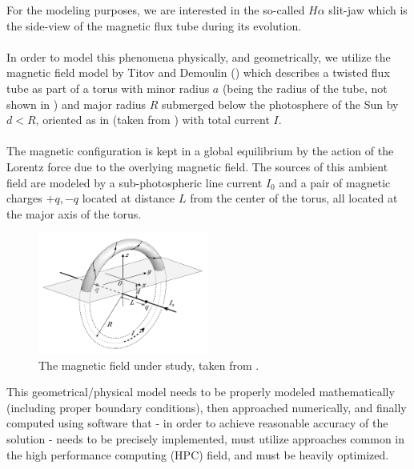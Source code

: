 For the modeling purposes, we are interested in the so-called $H\alpha$ slit-jaw which is the side-view of the magnetic flux tube during its evolution.
\paragraph{}
In order to model this phenomena physically, and geometrically, we utilize the magnetic field model by Titov and Demoulin (\cite{td}) which describes a twisted flux tube as part of a torus with minor radius $a$ (being the radius of the tube, not shown in ) and major radius $R$ submerged below the photosphere of the Sun by $d < R$, oriented as in  (taken from \cite{td}) with total current $I$.
\paragraph{}
The magnetic configuration is kept in a global equilibrium by the action of the Lorentz force due to the overlying magnetic field. The sources of this ambient field are modeled by a sub-photospheric line current $I_0$ and a pair of magnetic charges $+q, -q$ located at distance $L$ from the center of the torus, all located at the major axis of the torus.

\begin{figure}[H]
	\begin{center}
		\includegraphics[width=0.5\textwidth]{img/td-setup/fromTD.jpg}
	\caption{The magnetic field under study, taken from \cite{td}.}
	\label{figure:td}
	\end{center}
\end{figure}

This geometrical/physical model needs to be properly modeled mathematically (including proper boundary conditions), then approached numerically, and finally computed using software that - in order to achieve reasonable accuracy of the solution - needs to be precisely implemented, must utilize approaches common in the high performance computing (HPC) field, and must be heavily optimized.
